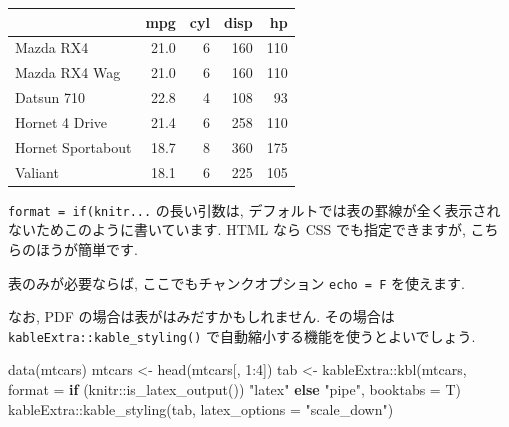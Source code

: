 \documentclass[
]{ltjsarticle}
\newenvironment{Shaded}{\begin{snugshade}}{\end{snugshade}}
\newcommand{\AttributeTok}[1]{\textcolor[rgb]{0.77,0.63,0.00}{#1}}
\newcommand{\ControlFlowTok}[1]{\textcolor[rgb]{0.13,0.29,0.53}{\textbf{#1}}}
\newcommand{\DecValTok}[1]{\textcolor[rgb]{0.00,0.00,0.81}{#1}}
\newcommand{\FunctionTok}[1]{\textcolor[rgb]{0.00,0.00,0.00}{#1}}
\newcommand{\NormalTok}[1]{#1}
\newcommand{\OtherTok}[1]{\textcolor[rgb]{0.56,0.35,0.01}{#1}}
\newcommand{\SpecialCharTok}[1]{\textcolor[rgb]{0.00,0.00,0.00}{#1}}
\newcommand{\StringTok}[1]{\textcolor[rgb]{0.31,0.60,0.02}{#1}}
\begin{document}
\begin{tabular}[t]{lrrrr}
\toprule
  & mpg & cyl & disp & hp\\
\midrule
Mazda RX4 & 21.0 & 6 & 160 & 110\\
Mazda RX4 Wag & 21.0 & 6 & 160 & 110\\
Datsun 710 & 22.8 & 4 & 108 & 93\\
Hornet 4 Drive & 21.4 & 6 & 258 & 110\\
Hornet Sportabout & 18.7 & 8 & 360 & 175\\
\addlinespace
Valiant & 18.1 & 6 & 225 & 105\\
\bottomrule
\end{tabular}

\texttt{format\ =\ if(knitr...} の長い引数は, デフォルトでは表の罫線が全く表示されないためこのように書いています. HTML なら CSS でも指定できますが, こちらのほうが簡単です.

表のみが必要ならば, ここでもチャンクオプション \texttt{echo\ =\ F} を使えます.

なお, PDF の場合は表がはみだすかもしれません. その場合は \texttt{kableExtra::kable\_styling()} で自動縮小する機能を使うとよいでしょう.

\begin{Shaded}
\begin{Highlighting}[numbers=left,,]
\FunctionTok{data}\NormalTok{(mtcars)}
\NormalTok{mtcars }\OtherTok{\textless{}{-}} \FunctionTok{head}\NormalTok{(mtcars[, }\DecValTok{1}\SpecialCharTok{:}\DecValTok{4}\NormalTok{])}
\NormalTok{tab }\OtherTok{\textless{}{-}}\NormalTok{ kableExtra}\SpecialCharTok{::}\FunctionTok{kbl}\NormalTok{(mtcars, }\AttributeTok{format =} \ControlFlowTok{if}\NormalTok{ (knitr}\SpecialCharTok{::}\FunctionTok{is\_latex\_output}\NormalTok{()) }\StringTok{"latex"} \ControlFlowTok{else} \StringTok{"pipe"}\NormalTok{, }\AttributeTok{booktabs =}\NormalTok{ T)}
\NormalTok{kableExtra}\SpecialCharTok{::}\FunctionTok{kable\_styling}\NormalTok{(tab, }\AttributeTok{latex\_options =} \StringTok{"scale\_down"}\NormalTok{)}
\end{Highlighting}
\end{Shaded}

\begin{table}
\centering
{}
\end{table}
\end{document}
